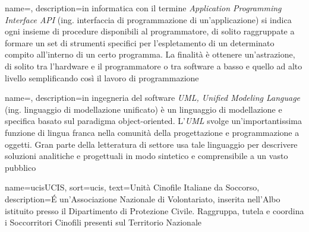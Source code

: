 \makeglossaries
\renewcommand{\acronymname}{Acronimi e abbreviazioni}







\renewcommand{\glossaryname}{Glossario}

{
    name=,
    description={in informatica con il termine \emph{Application Programming Interface API} (ing. interfaccia di programmazione di un'applicazione) si indica ogni insieme di procedure disponibili al programmatore, di solito raggruppate a formare un set di strumenti specifici per l'espletamento di un determinato compito all'interno di un certo programma. La finalità è ottenere un'astrazione, di solito tra l'hardware e il programmatore o tra software a basso e quello ad alto livello semplificando così il lavoro di programmazione}
}

{
    name=,
    description={in ingegneria del software \emph{UML, Unified Modeling Language} (ing. linguaggio di modellazione unificato) è un linguaggio di modellazione e specifica basato sul paradigma object-oriented. L'\emph{UML} svolge un'importantissima funzione di lingua franca nella comunità della progettazione e programmazione a oggetti. Gran parte della letteratura di settore usa tale linguaggio per descrivere soluzioni analitiche e progettuali in modo sintetico e comprensibile a un vasto pubblico}
}

{
    name=\gls{ucis}{UCIS},
    sort=ucis,
    text=Unità Cinofile Italiane da Soccorso,
    description={É un'Associazione Nazionale di Volontariato, inserita nell'Albo istituito presso il Dipartimento di Protezione Civile. Raggruppa, tutela e coordina i Soccorritori Cinofili presenti sul Territorio Nazionale}
}

